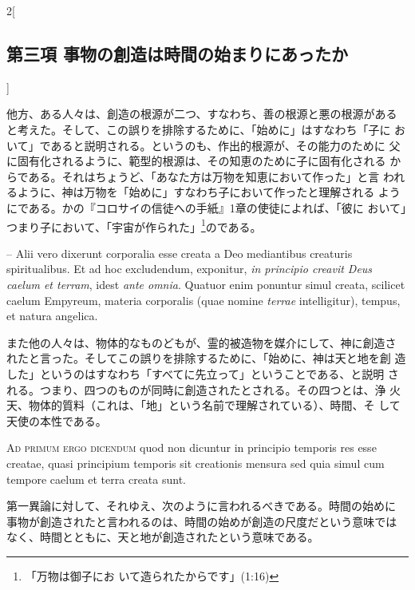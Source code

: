 \documentclass[paper=a4paper,fontsize=10pt,jafontsize=9pt,titlepage]{jlreq}
\begin{document}
\begin{paracol}{2}[\subsection{第三項 事物の創造は時間の始まりにあったか}]
\switchcolumn


他方、ある人々は、創造の根源が二つ、すなわち、善の根源と悪の根源がある
と考えた。そして、この誤りを排除するために、「始めに」はすなわち「子に
おいて」であると説明される。というのも、作出的根源が、その能力のために
父に固有化されるように、範型的根源は、その知恵のために子に固有化される
からである。それはちょうど、「あなた方は万物を知恵において作った」と言
われるように、神は万物を「始めに」すなわち子において作ったと理解される
ようにである。かの『コロサイの信徒への手紙』1章の使徒によれば、「彼に
おいて」つまり子において、「宇宙が作られた」\footnote{「万物は御子にお
いて造られたからです」(1:16)}のである。


\switchcolumn*


-- Alii vero dixerunt corporalia esse creata a Deo mediantibus creaturis
spiritualibus. Et ad hoc excludendum, exponitur, {\itshape in principio
creavit Deus caelum et terram}, idest {\itshape ante omnia}. Quatuor
enim ponuntur simul creata, scilicet caelum Empyreum, materia corporalis
(quae nomine {\itshape terrae} intelligitur), tempus, et natura angelica.


\switchcolumn


また他の人々は、物体的なものどもが、霊的被造物を媒介にして、神に創造さ
れたと言った。そしてこの誤りを排除するために、「始めに、神は天と地を創
造した」というのはすなわち「すべてに先立って」ということである、と説明
される。つまり、四つのものが同時に創造されたとされる。その四つとは、浄
火天、物体的質料（これは、「地」という名前で理解されている）、時間、そ
して天使の本性である。


\switchcolumn*[\subsection{ad.1}]


{\scshape Ad primum ergo dicendum} quod non dicuntur in
principio temporis res esse creatae, quasi principium temporis sit
creationis mensura sed quia simul cum tempore caelum et terra creata
sunt.


\switchcolumn


第一異論に対して、それゆえ、次のように言われるべきである。時間の始めに
事物が創造されたと言われるのは、時間の始めが創造の尺度だという意味では
なく、時間とともに、天と地が創造されたという意味である。


\switchcolumn*[\subsection{ad.2}]



\end{paracol}
\end{document}
